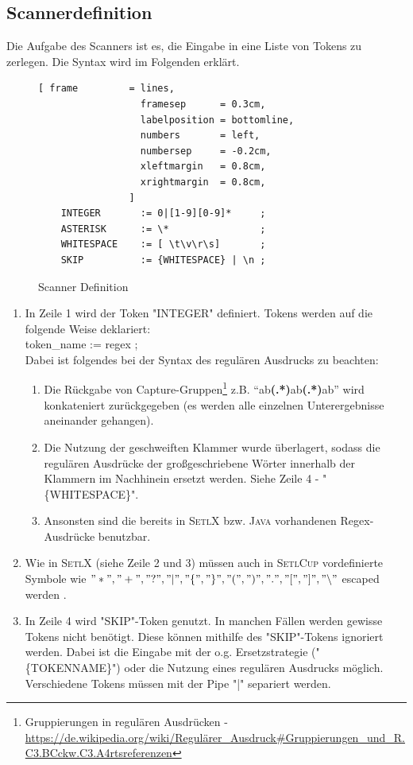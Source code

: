 \subsection{Scannerdefinition}
Die Aufgabe des Scanners ist es, die Eingabe in eine Liste von Tokens zu zerlegen. Die Syntax wird im Folgenden erklärt.
\begin{figure}[!ht]
\begin{Verbatim}[ frame         = lines, 
                  framesep      = 0.3cm, 
                  labelposition = bottomline,
                  numbers       = left,
                  numbersep     = -0.2cm,
                  xleftmargin   = 0.8cm,
                  xrightmargin  = 0.8cm,
                ]
	INTEGER       := 0|[1-9][0-9]*     ;
	ASTERISK      := \*                ;
	WHITESPACE    := [ \t\v\r\s]       ;
	SKIP          := {WHITESPACE} | \n ;
\end{Verbatim}
\caption{Scanner Definition}
\label{fig:scanner_def}
\end{figure}
\begin{enumerate}
	\item In Zeile 1 wird der Token "INTEGER" definiert. Tokens werden auf die folgende Weise deklariert:\\
					token\_name := regex ; \\
					Dabei ist folgendes bei der Syntax des regulären Ausdrucks zu beachten:
					\begin{enumerate}
						\item Die Rückgabe von Capture-Gruppen\footnote{Gruppierungen in regulären Ausdrücken -  \url{https://de.wikipedia.org/wiki/Regulärer_Ausdruck\#Gruppierungen_und_R.C3.BCckw.C3.A4rtsreferenzen}} z.B. "`ab\textbf{(.*)}ab\textbf{(.*)}ab"'	wird konkateniert zurückgegeben (es werden alle einzelnen Unterergebnisse aneinander gehangen).
						\item Die Nutzung der geschweiften Klammer wurde überlagert, sodass die regulären Ausdrücke der großgeschriebene Wörter innerhalb der Klammern im Nachhinein ersetzt werden. Siehe Zeile 4 - "\{WHITESPACE\}".
						\item Ansonsten sind die bereits in \textsc{SetlX} bzw. \textsc{Java} vorhandenen Regex-Ausdrücke benutzbar.
					\end{enumerate}
	\item Wie in \textsc{SetlX} (siehe Zeile 2 und 3) müssen auch in \textsc{SetlCup} vordefinierte Symbole wie $"*","+","?","|","\{","\}","(",")",".","[","]","\backslash"$ escaped werden .
	\item In Zeile 4 wird "SKIP"-Token genutzt. In manchen Fällen werden gewisse Tokens nicht benötigt. Diese können mithilfe des "SKIP"-Tokens ignoriert werden. Dabei ist die Eingabe mit der o.g. Ersetzstrategie ("\{TOKENNAME\}") oder die Nutzung eines regulären Ausdrucks möglich. Verschiedene Tokens müssen mit der Pipe "|" separiert werden.
\end{enumerate}

